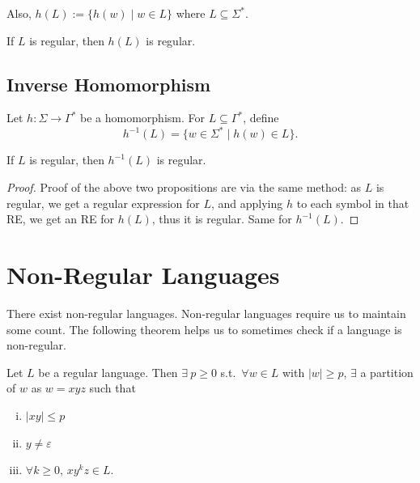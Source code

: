 Also, $h(L) := \{ h(w) \mid w \in L \}$ where $L \subseteq \Sigma^*$.

\begin{blackbox}
\begin{proposition}
If $L$ is regular, then $h(L)$ is regular.
\end{proposition}
\end{blackbox}

\section{Inverse Homomorphism}

Let $h : \Sigma \to \Gamma^*$ be a homomorphism. For $L \subseteq \Gamma^*$, define
\[
h^{-1}(L) = \{ w \in \Sigma^* \mid h(w) \in L \}.
\]

\begin{blackbox}
\begin{proposition}
If $L$ is regular, then $h^{-1}(L)$ is regular.
\end{proposition}
\end{blackbox}

\begin{proof}
Proof of the above two propositions are via the same method: as $L$ is regular, we get a regular expression for $L$, and applying $h$ to each symbol in that RE, we get an RE for $h(L)$, thus it is regular. Same for $h^{-1}(L)$.
\end{proof}

\chapter*{Non-Regular Languages}

There exist non-regular languages. Non-regular languages require us to maintain some count. The following theorem helps us to sometimes check if a language is non-regular.

\begin{blackbox}
\begin{lemma}
Let $L$ be a regular language. Then $\exists\ p \geq 0$ s.t.\ $\forall w \in L$ with $|w| \geq p$, $\exists$ a partition of $w$ as $w = xyz$ such that
\begin{enumerate}[(i)]
    \item $|xy| \leq p$
    \item $y \neq \varepsilon$
    \item $\forall k \geq 0$, $xy^k z \in L$.
\end{enumerate}
\end{lemma}
\end{blackbox}

